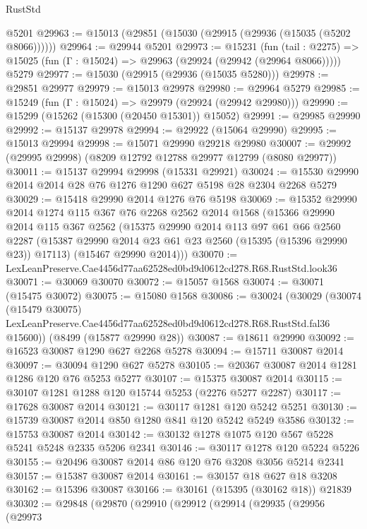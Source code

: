 \begin{lexlean}{RustStd}
\begin{coremodule}
    @5201
@29963 := @15013 (@29851 (@15030 (@29915 (@29936 (@15035 (@5202 @8066))))))
@29964 := @29944 @5201
@29973 := @15231
    (fun (tail : @2275) => @15025 (fun (Γ : @15024) => @29963 (@29924 (@29942 (@29964 @8066)))))
    @5279
@29977 := @15030 (@29915 (@29936 (@15035 @5280)))
@29978 := @29851 @29977
@29979 := @15013 @29978
@29980 := @29964 @5279
@29985 := @15249 (fun (Γ : @15024) => @29979 (@29924 (@29942 @29980)))
@29990 := @15299 (@15262 (@15300 (@20450 @15301)) @15052)
@29991 := @29985 @29990
@29992 := @15137 @29978
@29994 := @29922 (@15064 @29990)
@29995 := @15013 @29994
@29998 := @15071 @29990 @29218 @29980
@30007 := @29992 (@29995 @29998) (@8209 @12792 @12788 @29977 @12799 (@8080 @29977))
@30011 := @15137 @29994 @29998 (@15331 @29921)
@30024 := @15530 @29990 @2014 @2014 @28 @76 @1276 @1290 @627 @5198 @28 @2304 @2268 @5279
@30029 := @15418 @29990 @2014 @1276 @76 @5198
@30069 := @15352
    @29990
    @2014
    @1274
    @115
    @367
    @76
    @2268
    @2562
    @2014
    @1568
    (@15366
      @29990
      @2014
      @115
      @367
      @2562
      (@15375
        @29990
        @2014
        @113
        @97
        @61
        @66
        @2560
        @2287
        (@15387 @29990 @2014 @23 @61 @23 @2560 (@15395 (@15396 @29990 @23)) @17113)
        (@15467 @29990 @2014)))
@30070 := LexLeanPreserve.Cae4456d77aa62528ed0bd9d0612cd278.R68.RustStd.look36
@30071 := @30069 @30070
@30072 := @15057 @1568
@30074 := @30071 (@15475 @30072)
@30075 := @15080 @1568
@30086 := @30024
    (@30029
      (@30074
        (@15479 @30075)
        LexLeanPreserve.Cae4456d77aa62528ed0bd9d0612cd278.R68.RustStd.fal36
        @15600))
    (@8499 (@15877 @29990 @28))
@30087 := @18611 @29990
@30092 := @16523 @30087 @1290 @627 @2268 @5278
@30094 := @15711 @30087 @2014
@30097 := @30094 @1290 @627 @5278
@30105 := @20367 @30087 @2014 @1281 @1286 @120 @76 @5253 @5277
@30107 := @15375 @30087 @2014
@30115 := @30107 @1281 @1288 @120 @15744 @5253 (@2276 @5277 @2287)
@30117 := @17628 @30087 @2014
@30121 := @30117 @1281 @120 @5242 @5251
@30130 := @15739 @30087 @2014 @850 @1280 @841 @120 @5242 @5249 @3586
@30132 := @15753 @30087 @2014
@30142 := @30132 @1278 @1075 @120 @567 @5228 @5241 @5248 @2335 @5206 @2341
@30146 := @30117 @1278 @120 @5224 @5226
@30155 := @20496 @30087 @2014 @86 @120 @76 @3208 @3056 @5214 @2341
@30157 := @15387 @30087 @2014
@30161 := @30157 @18 @627 @18 @3208
@30162 := @15396 @30087
@30166 := @30161 (@15395 (@30162 @18)) @21839
@30302 := @29848
    (@29870
      (@29910
        (@29912
          (@29914
            (@29935
              (@29956
                (@29973

\end{coremodule}
\end{lexlean}
